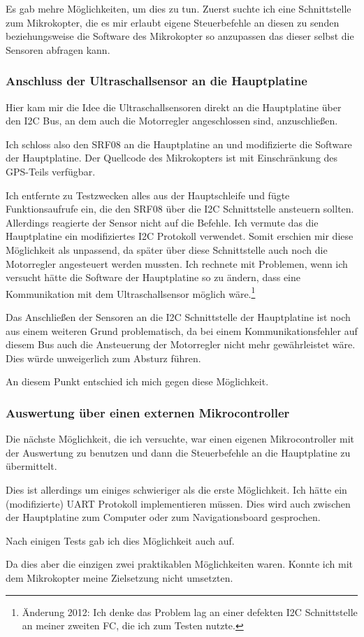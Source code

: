 Es gab mehre Möglichkeiten, um dies zu tun.
Zuerst suchte ich eine Schnittstelle zum Mikrokopter,
die es mir erlaubt eigene Steuerbefehle an diesen zu senden
beziehungsweise die Software des Mikrokopter so
anzupassen das dieser selbst die Sensoren abfragen kann.

\subsubsection{Anschluss der Ultraschallsensor an die Hauptplatine}
Hier kam mir die Idee die Ultraschallsensoren direkt an die
Hauptplatine über den \ac{I2C} Bus,
an dem auch die Motorregler angeschlossen sind, anzuschließen.

Ich schloss also den SRF08 an die Hauptplatine an
und modifizierte die Software der Hauptplatine.
Der Quellcode des Mikrokopters ist mit Einschränkung
des \ac{GPS}-Teils verfügbar.

Ich entfernte zu Testzwecken alles aus der
Hauptschleife und fügte Funktionsaufrufe ein,
die den SRF08 über die \ac{I2C} Schnittstelle
ansteuern sollten.
Allerdings reagierte der Sensor nicht auf die Befehle.
Ich vermute das die Hauptplatine ein modifiziertes
\ac{I2C} Protokoll verwendet.
Somit erschien mir diese Möglichkeit als unpassend,
da später über diese Schnittstelle auch noch die Motorregler
angesteuert werden mussten.
Ich rechnete mit Problemen, wenn ich versucht hätte die
Software der Hauptplatine so zu ändern, dass eine Kommunikation mit
dem Ultraschallsensor möglich wäre.\footnote{Änderung 2012: Ich denke das Problem lag an einer
defekten \ac{I2C} Schnittstelle an meiner zweiten FC, die ich zum Testen nutzte.}

Das Anschließen der Sensoren an die \ac{I2C} Schnittstelle der Hauptplatine
ist noch aus einem weiteren Grund problematisch,
da bei einem Kommunikationsfehler auf diesem Bus auch die
Ansteuerung der Motorregler nicht mehr gewährleistet wäre.
Dies würde unweigerlich zum Absturz führen.

An diesem Punkt entschied ich mich gegen diese Möglichkeit.

\subsubsection{Auswertung über einen externen Mikrocontroller}
Die nächste Möglichkeit, die ich versuchte, war einen eigenen
Mikrocontroller mit der Auswertung zu benutzen
und dann die Steuerbefehle an die Hauptplatine zu übermittelt.

Dies ist allerdings um einiges schwieriger als die erste Möglichkeit.
Ich hätte ein (modifizierte) UART Protokoll implementieren müssen.
Dies wird auch zwischen der Hauptplatine zum Computer
oder zum Navigationsboard gesprochen.

Nach einigen Tests gab ich dies Möglichkeit auch auf.

Da dies aber die einzigen zwei praktikablen
Möglichkeiten waren.
Konnte ich mit dem Mikrokopter meine
Zielsetzung nicht umsetzten.

